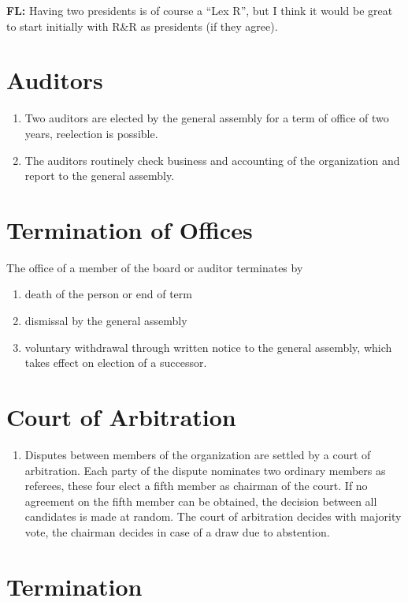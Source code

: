 \documentclass[a4paper]{article}
\newcommand{\note}[2]{{\it \par\noindent\textbf{#1:} #2}}
\begin{document}
\note{FL}{Having two presidents is of course a ``Lex R'', but I think it
  would be great to start initially with R\&R as presidents (if they agree).}

\section{Auditors}

\begin{enumerate}
 \item Two auditors are elected by the general assembly for a term of
  office of two years, reelection is possible.
 \item The auditors routinely check business and accounting of the
  organization and report to the general assembly.
\end{enumerate}

\section{Termination of Offices}

The office of a member of the board or auditor terminates by
\begin{enumerate}
 \item death of the person or end of term
 \item dismissal by the general assembly
 \item voluntary withdrawal through written notice to the general
  assembly, which takes effect on election of a successor.
\end{enumerate}

\section{Court of Arbitration}

\begin{enumerate}
 \item Disputes between members of the organization are settled by a
  court of arbitration. Each party of the dispute nominates two
  ordinary members as referees, these four elect a fifth member as
  chairman of the court.  If no agreement on the fifth member can be
  obtained, the decision between all candidates is made at random. The
  court of arbitration decides with majority vote, the chairman
  decides in case of a draw due to abstention.

\end{enumerate}

\section{Termination}
\end{document}
